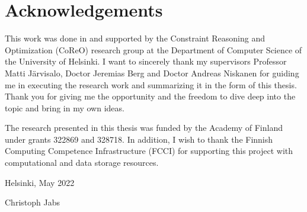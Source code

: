 \chapter*{Acknowledgements}

This work was done in and supported by the Constraint Reasoning and Optimization (CoReO) research group at the Department of Computer Science of the University of Helsinki.
I want to sincerely thank my supervisors Professor Matti Järvisalo, Doctor Jeremias Berg and Doctor Andreas Niskanen for guiding me in executing the research work and summarizing it in the form of this thesis.
Thank you for giving me the opportunity and the freedom to dive deep into the topic and bring in my own ideas.

The research presented in this thesis was funded by the Academy of Finland under grants 322869 and 328718.
In addition, I wish to thank the Finnish Computing Competence Infrastructure (FCCI) for supporting this project with computational and data storage resources.

\begin{flushright}
  Helsinki, May 2022

  Christoph Jabs
\end{flushright}